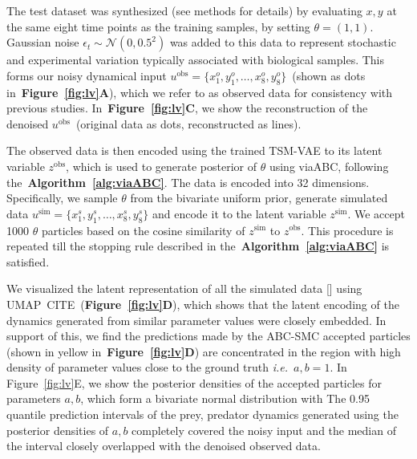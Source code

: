 \documentclass[12pt]{article} %
\newcommand{\ie}{\textit{i.e.}~}
\newcommand{\blue}[1]{{\color{magenta}{#1}}}
\begin{document}
The test dataset was synthesized (see methods for details) by evaluating $x, y$ at the same eight time points as the training samples, by setting \( \theta = (1, 1)\).
Gaussian noise \(\epsilon_t \sim \mathcal{N}(0, 0.5^2)\) was added to this data to represent stochastic and experimental variation typically associated with biological samples.
This forms our noisy dynamical input $u^{\mathrm{obs}} = \{x^o_1, y^o_1, \dots, x^o_8, y^o_8\}$~(shown as dots in~\textbf{Figure~\ref{fig:lv}A}), which we refer to as observed data for consistency with previous studies.
In~\textbf{Figure~\ref{fig:lv}C}, we show the reconstruction of the denoised $u^{\mathrm{obs}}$~(original data as dots, reconstructed as lines). \blue{cite toni and khan, mention that this is exact same data used in their studies}

The observed data is then encoded using the trained TSM-VAE to its latent variable $z^{\mathrm{obs}}$, which is used to generate posterior of $\theta$ using viaABC, following the~\textbf{Algorithm~\ref{alg:viaABC}}. The data is encoded into 32 dimensions. \blue{To note, data is encoded to a higher latent dimension, which we believe helps in recording global patterns and local contextual dependencies.}
Specifically, we sample $\theta$ from the bivariate uniform prior, generate simulated data $u^{\mathrm{sim}} = \{x^s_1, y^s_1, \dots, x^s_8, y^s_8\}$ and encode it to the latent variable $z^{\mathrm{sim}}$.
We accept 1000 $\theta$ particles based on the cosine similarity of $z^{\mathrm{sim}}$ to $z^{\mathrm{obs}}$.
This procedure is repeated till the stopping rule described in the~\textbf{Algorithm~\ref{alg:viaABC}} is satisfied.

We visualized the latent representation of all the simulated data [\blue{num iterations, num samples}]  using UMAP~CITE~(\textbf{Figure~\ref{fig:lv}D}), which shows that the latent encoding of the dynamics generated from similar parameter values were closely embedded.
\blue{Keeping in mind that UMAP visualizations are 2-dimensional projections of 32-dimensional latent variables, we conclude that the latent variables that we used to perform ABC-SMC represent an interpretable, ordered evaluations of model parameters.}
In support of this, we find the predictions made by the ABC-SMC accepted particles (shown in yellow in~\textbf{Figure~\ref{fig:lv}D}) are concentrated in the region with high density of parameter values close to the ground truth \ie $a,b =1$.
In Figure~\ref{fig:lv}E, we show the posterior densities of the accepted particles for parameters $a, b$, which form a bivariate normal distribution with \blue{means XX and covariance matrix XX.}
The 0.95 quantile prediction intervals of the prey, predator dynamics generated using the posterior densities of $a, b$ completely covered the noisy input and the median of the interval closely overlapped with the denoised observed data.  
\end{document}
